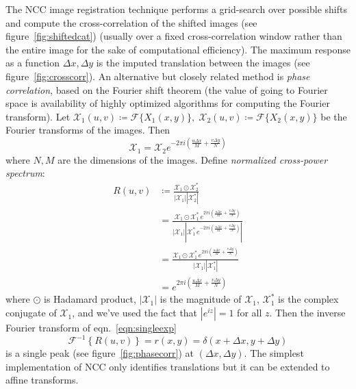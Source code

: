 
%
The NCC image registration technique performs a grid-search over possible shifts and compute the cross-correlation of the shifted images (see figure~\ref{fig:shiftedcat}) (usually over a fixed cross-correlation window rather than the entire image for the sake of computational efficiency).
%
The maximum response as a function \(\Delta x, \Delta y\) is the imputed translation between the images (see figure~\ref{fig:crosscorr}).
%
An alternative but closely related method is \textit{phase correlation}, based on the Fourier shift theorem  (the value of going to Fourier space is availability of highly optimized algorithms for computing the Fourier transform).
%
Let \(\mathcal{X}_1(u,v) \coloneqq \mathcal{F}\{X_1(x,y)\}, \; \mathcal{X}_2(u,v) \coloneqq \mathcal{F}\{X_2(x,y)\}\) be the Fourier transforms of the images.
%
Then
\[
	\mathcal{X}_1 = \mathcal{X}_2  e^{-2 \pi i \left(\frac{u \Delta x}{M} + \frac{v \Delta y}{N}\right)}
\]
where \(N,M\) are the dimensions of the images.
%
Define \textit{normalized cross-power spectrum}:
\begin{align}
	R(u,v) & \coloneqq \frac{\mathcal{X}_1\odot \mathcal{X}_2^{*}}{|\mathcal{X}_1 ||\mathcal{X}_2^{*} |}                                                                                                                    \\
	       & = \frac{\mathcal{X}_1\odot \mathcal{X}_1^{*} \, e^{2 \pi i \left(\frac{u \Delta x}{M} + \frac{v \Delta y}{N}\right)}}{|\mathcal{X}_1 ||\mathcal{X}_1^{*} \, e^{-2 \pi i \left(\frac{u \Delta x}{M} + \frac{v \Delta y}{N}\right)} |} \\
	       & = \frac{\mathcal{X}_1\odot \mathcal{X}_1^{*} \, e^{2 \pi i \left(\frac{u \Delta x}{M} + \frac{v \Delta y}{N}\right)}}{|\mathcal{X}_1 ||\mathcal{X}_1^{*} |}                                                               \\
	       & = e^{2 \pi i \left(\frac{u \Delta x}{M} + \frac{v \Delta y}{N}\right)} \label{eqn:singleexp}
\end{align}
where \(\odot\) is Hadamard product, \(|\mathcal{X}_1|\) is the magnitude of \(\mathcal{X}_1\), \(\mathcal{X}_1^*\) is the complex conjugate of \(\mathcal{X}_1\), and we've used the fact that \(|e^{iz}|=1\) for all \(z\).
%
Then the inverse Fourier transform of eqn.~\eqref{eqn:singleexp}
\[
	\mathcal{F}^{-1}\left\{ R(u,v) \right\} = r(x,y) = \delta(x + \Delta x, y + \Delta y)
\]
is a single peak (see figure~\ref{fig:phasecorr}) at \((\Delta x, \Delta y)\).
%
The simplest implementation of NCC only identifies translations but it can be extended to affine transforms\cite{berthilsson1998}.

